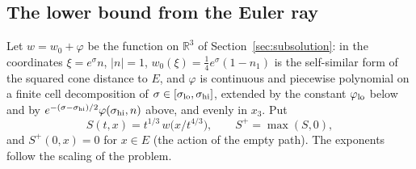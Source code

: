 \documentclass[11pt]{article}
\theoremstyle{definition}
\begin{document}
\subsection{The lower bound from the Euler ray}\label{sec:lower}
Let $w=w_0+\varphi$ be the function on $\mathbb R^3$ of Section~\ref{sec:subsolution}: in the coordinates
$\xi=e^{\sigma}n$, $|n|=1$, $w_0(\xi)=\tfrac14e^{\sigma}(1-n_1)$ is the self-similar form of the squared cone distance
to $E$, and $\varphi$ is continuous and piecewise polynomial on a finite cell decomposition of
$\sigma\in[\sigma_{\rm lo},\sigma_{\rm hi}]$, extended by the constant $\varphi_{\rm lo}$ below and by
$e^{-(\sigma-\sigma_{\rm hi})/2}\varphi(\sigma_{\rm hi},n)$ above, and evenly in $x_3$. Put
\[
  S(t,x)=t^{1/3}\,w\bigl(x/t^{4/3}\bigr),\qquad S^+=\max(S,0),
\]
and $S^+(0,x)=0$ for $x\in E$ (the action of the empty path). The exponents follow the scaling of the problem.
\end{document}
